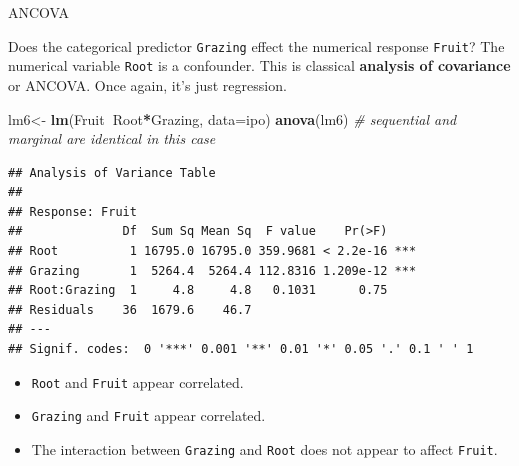 \documentclass[
  ignorenonframetext,
]{beamer}
\newenvironment{Shaded}{\begin{snugshade}}{\end{snugshade}}
\newcommand{\CommentTok}[1]{\textcolor[rgb]{0.56,0.35,0.01}{\textit{#1}}}
\newcommand{\DataTypeTok}[1]{\textcolor[rgb]{0.13,0.29,0.53}{#1}}
\newcommand{\KeywordTok}[1]{\textcolor[rgb]{0.13,0.29,0.53}{\textbf{#1}}}
\newcommand{\NormalTok}[1]{#1}
\newcommand{\OperatorTok}[1]{\textcolor[rgb]{0.81,0.36,0.00}{\textbf{#1}}}
\newcommand{\StringTok}[1]{\textcolor[rgb]{0.31,0.60,0.02}{#1}}
\providecommand{\tightlist}{%
  \setlength{\itemsep}{0pt}\setlength{\parskip}{0pt}}
\begin{document}
\begin{frame}[fragile]{ANCOVA}
\protect\hypertarget{ancova}{}

Does the categorical predictor \texttt{Grazing} effect the numerical
response \texttt{Fruit}? The numerical variable \texttt{Root} is a
confounder. This is classical \textbf{analysis of covariance} or ANCOVA.
Once again, it's just regression.

\scriptsize

\begin{Shaded}
\begin{Highlighting}[]
\NormalTok{lm6<-}\StringTok{ }\KeywordTok{lm}\NormalTok{(Fruit}\OperatorTok{~}\NormalTok{Root}\OperatorTok{*}\NormalTok{Grazing, }\DataTypeTok{data=}\NormalTok{ipo)}
\KeywordTok{anova}\NormalTok{(lm6) }\CommentTok{# sequential and marginal are identical in this case}
\end{Highlighting}
\end{Shaded}

\begin{verbatim}
## Analysis of Variance Table
## 
## Response: Fruit
##              Df  Sum Sq Mean Sq  F value    Pr(>F)    
## Root          1 16795.0 16795.0 359.9681 < 2.2e-16 ***
## Grazing       1  5264.4  5264.4 112.8316 1.209e-12 ***
## Root:Grazing  1     4.8     4.8   0.1031      0.75    
## Residuals    36  1679.6    46.7                       
## ---
## Signif. codes:  0 '***' 0.001 '**' 0.01 '*' 0.05 '.' 0.1 ' ' 1
\end{verbatim}

\normalsize

\begin{itemize}
\tightlist
\item
  \texttt{Root} and \texttt{Fruit} appear correlated.
\item
  \texttt{Grazing} and \texttt{Fruit} appear correlated.
\item
  The interaction between \texttt{Grazing} and \texttt{Root} does not
  appear to affect \texttt{Fruit}.
\end{itemize}

\end{frame}
\end{document}
